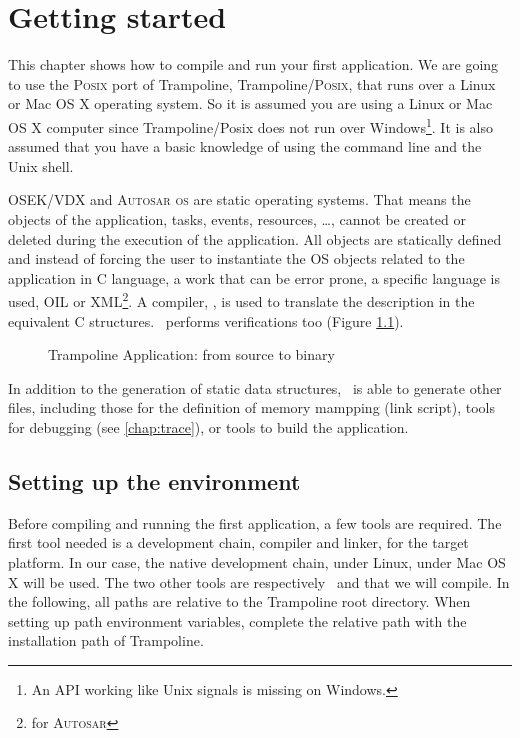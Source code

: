 
\chapter{Getting started}

This chapter shows how to compile and run your first application. We are going to use the \textsc{Posix} port of Trampoline, Trampoline/\textsc{Posix}, that runs over a Linux or Mac OS X operating system. So it is assumed you are using a Linux or Mac OS X computer since Trampoline/Posix does not run over Windows\footnote{An API working like Unix signals is missing on Windows.}. It is also assumed that you have a basic knowledge of using the command line and the Unix shell.

OSEK/VDX and \textsc{Autosar os} are static operating systems. That means the objects of the application, tasks, events, resources, \ldots, cannot be created or deleted during the execution of the application. All objects are statically defined and instead of forcing the user to instantiate the OS objects related to the application in C language, a work that can be error prone, a specific language is used, OIL or XML\footnote{for \textsc{Autosar}}. A compiler, \goil, is used to translate the description in the equivalent C structures. \goil\ performs verifications too (Figure \ref{fig:files}).

\begin{figure}[htbp]
  \centering
\begin{adjustbox}{width=.7\linewidth,keepaspectratio}
  
\end{adjustbox}
\caption{Trampoline Application: from source to binary}
\label{fig:files}
\end{figure}

In addition to the generation of static data structures, \goil\ is able to generate other files, including those for the definition of memory mampping (link script), tools for debugging (see \ref{chap:trace}), or tools to build the application.

\section{Setting up the environment}

Before compiling and running the first application, a few tools are required. The first tool needed is a development chain, compiler and linker, for the target platform. In our case, the native development chain,  under Linux,  under Mac OS X will be used. The two other tools are respectively \goil\ and  that we will compile. In the following, all paths are relative to the Trampoline root directory. When setting up path environment variables, complete the relative path with the installation path of Trampoline.

